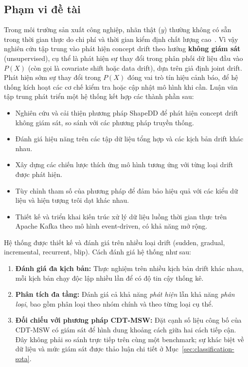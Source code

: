\subsection{Phạm vi đề tài}
Trong môi trường sản xuất công nghiệp, nhãn thật ($y$) thường không có sẵn trong thời gian thực do chi phí và thời gian kiểm định chất lượng cao~\cite{jourdan2023process}. Vì vậy nghiên cứu tập trung vào phát hiện concept drift theo hướng \textbf{không giám sát} (unsupervised), cụ thể là phát hiện sự thay đổi trong phân phối dữ liệu đầu vào $P(X)$ (còn gọi là covariate shift hoặc data drift), dựa trên giả định joint drift. Phát hiện sớm sự thay đổi trong $P(X)$ đóng vai trò tín hiệu cảnh báo, để hệ thống kích hoạt các cơ chế kiểm tra hoặc cập nhật mô hình khi cần.
Luận văn tập trung phát triển một hệ thống kết hợp các thành phần sau:
\begin{itemize}
	\item Nghiên cứu và cải thiện phương pháp ShapeDD để phát hiện concept drift không giám sát, so sánh với các phương pháp truyền thống.
	\item Đánh giá hiệu năng trên các tập dữ liệu tổng hợp và các kịch bản drift khác nhau.
	\item Xây dựng các chiến lược thích ứng mô hình tương ứng với từng loại drift được phát hiện.
	\item Tùy chỉnh tham số của phương pháp để đảm bảo hiệu quả với các kiểu dữ liệu và hiện tượng trôi dạt khác nhau.
	\item Thiết kế và triển khai kiến trúc xử lý dữ liệu luồng thời gian thực trên Apache Kafka theo mô hình event-driven, có khả năng mở rộng.
\end{itemize}

Hệ thống được thiết kế và đánh giá trên nhiều loại drift (sudden, gradual, incremental, recurrent, blip). Cách đánh giá hệ thống như sau:
\begin{enumerate}
	\item \textbf{Đánh giá đa kịch bản:} Thực nghiệm trên nhiều kịch bản drift khác nhau, mỗi kịch bản chạy độc lập nhiều lần để có độ tin cậy thống kê.
	\item \textbf{Phân tích đa tầng:} Đánh giá cả khả năng \textit{phát hiện} lẫn khả năng \textit{phân loại}, bao gồm phân loại theo nhóm chính và theo từng loại cụ thể.
	\item \textbf{Đối chiếu với phương pháp CDT-MSW:} Đặt cạnh số liệu công bố của CDT-MSW có giám sát để hình dung khoảng cách giữa hai cách tiếp cận. Đây không phải so sánh trực tiếp trên cùng một benchmark; sự khác biệt về dữ liệu và mức giám sát được thảo luận chi tiết ở Mục~\ref{sec:classification-sota}.
\end{enumerate}

